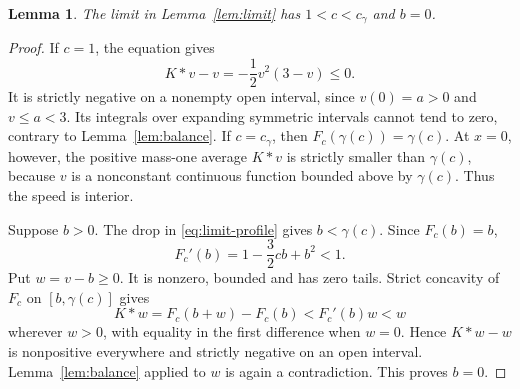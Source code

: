 \documentclass[11pt,a4paper]{article}
\newtheorem{lemma}[theorem]{Lemma}
\theoremstyle{remark}
\newcommand{\cg}{c_\gamma}
\begin{document}
\begin{lemma}\label{lem:zero-tail}
The limit in Lemma~\ref{lem:limit} has $1<c<\cg$ and $b=0$.
\end{lemma}
\begin{proof}
If $c=1$, the equation gives
\[
 K*v-v=-\frac12v^2(3-v)\le0.
\]
It is strictly negative on a nonempty open interval, since
$v(0)=a>0$ and $v\le a<3$. Its integrals over expanding symmetric
intervals cannot tend to zero, contrary to Lemma~\ref{lem:balance}.
If $c=\cg$, then $F_c(\gamma(c))=\gamma(c)$. At $x=0$, however,
the positive mass-one average $K*v$ is strictly smaller than
$\gamma(c)$, because $v$ is a nonconstant continuous function bounded
above by $\gamma(c)$. Thus the speed is interior.

Suppose $b>0$. The drop in \eqref{eq:limit-profile} gives
$b<\gamma(c)$. Since $F_c(b)=b$,
\[
 F_c'(b)=1-\frac32cb+b^2<1.
\]
Put $w=v-b\ge0$. It is nonzero, bounded and has zero tails. Strict
concavity of $F_c$ on $[b,\gamma(c)]$ gives
\[
 K*w=F_c(b+w)-F_c(b)<F_c'(b)w<w
\]
wherever $w>0$, with equality in the first difference when $w=0$.
Hence $K*w-w$ is nonpositive everywhere and strictly negative on an
open interval. Lemma~\ref{lem:balance} applied to $w$ is again a
contradiction. This proves $b=0$.
\end{proof}
\end{document}
